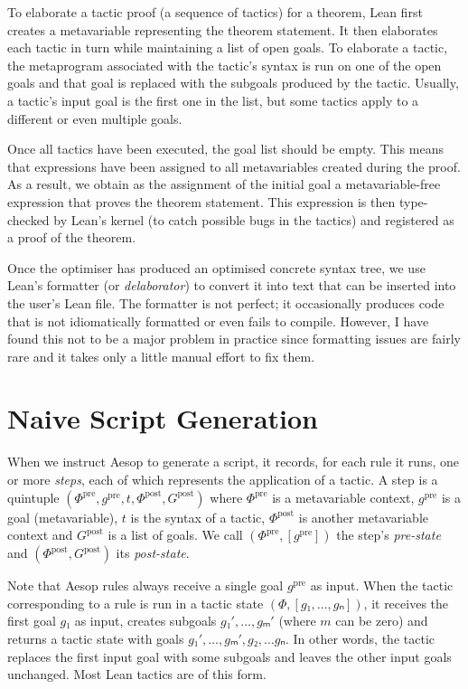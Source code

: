 \documentclass[sigplan,screen]{acmart}
\newcommand{\pre}{\mathrm{pre}}
\newcommand{\post}{\mathrm{post}}
\newcommand{\step}[5]{\ensuremath{(#1,\allowbreak #2,\allowbreak #3,\allowbreak #4,\allowbreak #5)}}
\begin{document}
To elaborate a tactic proof (a sequence of tactics) for a theorem, Lean first creates a metavariable representing the theorem statement.
It then elaborates each tactic in turn while maintaining a list of open goals.
To elaborate a tactic, the metaprogram associated with the tactic's syntax is run on one of the open goals and that goal is replaced with the subgoals produced by the tactic.
Usually, a tactic's input goal is the first one in the list, but some tactics apply to a different or even multiple goals.

Once all tactics have been executed, the goal list should be empty.
This means that expressions have been assigned to all metavariables created during the proof.
As a result, we obtain as the assignment of the initial goal a metavariable-free expression that proves the theorem statement.
This expression is then type-checked by Lean's kernel (to catch possible bugs in the tactics) and registered as a proof of the theorem.

Once the optimiser has produced an optimised concrete syntax tree, we use Lean's formatter (or \emph{delaborator}) to convert it into text that can be inserted into the user's Lean file.
The formatter is not perfect; it occasionally produces code that is not idiomatically formatted or even fails to compile.
However, I have found this not to be a major problem in practice since formatting issues are fairly rare and it takes only a little manual effort to fix them.

\section{Naive Script Generation}%
\label{sec:generation}

When we instruct Aesop to generate a script, it records, for each rule it runs, one or more \emph{steps}, each of which represents the application of a tactic.
A step is a quintuple $\step{Φ^{\pre}}{g^{\pre}}{t}{Φ^{\post}}{G^{\post}}$ where $Φ^{\pre}$ is a metavariable context,
$g^{\pre}$ is a goal (metavariable),
$t$ is the syntax of a tactic,
$Φ^{\post}$ is another metavariable context and $G^{\post}$ is a list of goals.
We call $(Φ^{\pre}, [g^{\pre}])$ the step's \emph{pre-state} and $(Φ^{\post}, G^{\post})$ its \emph{post-state}.

Note that Aesop rules always receive a single goal $g^{\pre}$ as input.
When the tactic corresponding to a rule is run in a tactic state $(Φ,\allowbreak [g₁, \dots, gₙ])$, it receives the first goal $g₁$ as input, creates subgoals $g₁', \dots, gₘ'$ (where $m$ can be zero) and returns a tactic state with goals $g₁', \dots, gₘ', g₂, \dots gₙ$.
In other words, the tactic replaces the first input goal with some subgoals and leaves the other input goals unchanged.
Most Lean tactics are of this form.
\end{document}
